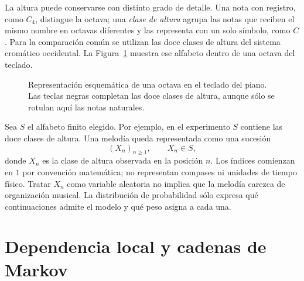 La altura puede conservarse con distinto grado de detalle. Una nota con registro, como $C_4$, distingue la octava; una \emph{clase de altura} agrupa las notas que reciben el mismo nombre en octavas diferentes y las representa con un solo símbolo, como $C$. Para la comparación común se utilizan las doce clases de altura del sistema cromático occidental. La Figura~\ref{fig:teclado-octava} muestra ese alfabeto dentro de una octava del teclado.

\begin{figure}[h]
\centering
{}
\caption{Representación esquemática de una octava en el teclado del piano. Las teclas negras completan las doce clases de altura, aunque sólo se rotulan aquí las notas naturales.}
\label{fig:teclado-octava}
\end{figure}

Sea $S$ el alfabeto finito elegido. Por ejemplo, en el experimento $S$ contiene las doce clases de altura. Una melodía queda representada como una sucesión
\[
(X_n)_{n\geq 1}, \qquad X_n\in S,
\]
donde $X_n$ es la clase de altura observada en la posición $n$. Los índices comienzan en $1$ por convención matemática; no representan compases ni unidades de tiempo físico. Tratar $X_n$ como variable aleatoria no implica que la melodía carezca de organización musical. La distribución de probabilidad sólo expresa qué continuaciones admite el modelo y qué peso asigna a cada una.

\section{Dependencia local y cadenas de Markov}


